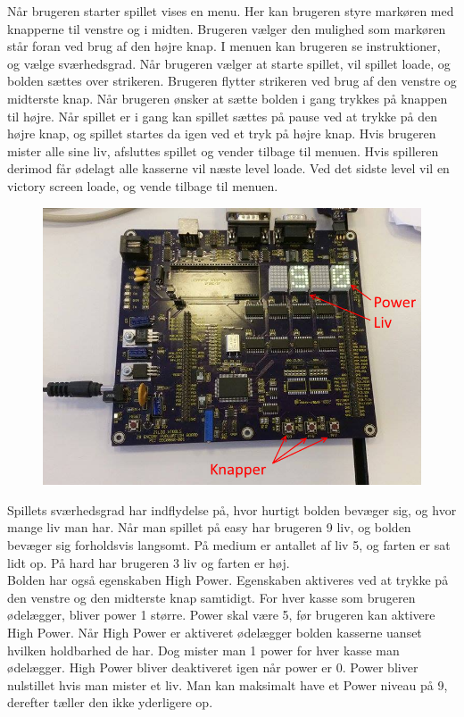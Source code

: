 Når brugeren starter spillet vises en menu. Her kan brugeren styre markøren med knapperne til venstre og i midten. Brugeren vælger den mulighed som markøren står foran ved brug af den højre knap. I menuen kan brugeren se instruktioner, og vælge sværhedsgrad. Når brugeren vælger at starte spillet, vil spillet loade, og bolden sættes over strikeren. Brugeren flytter strikeren ved brug af den venstre og midterste knap. Når brugeren ønsker at sætte bolden i gang trykkes på knappen til højre. Når spillet er i gang kan spillet sættes på pause ved at trykke på den højre knap, og spillet startes da igen ved et tryk på højre knap. Hvis brugeren mister alle sine liv, afsluttes spillet og vender tilbage til menuen. Hvis spilleren derimod får ødelagt alle kasserne vil næste level loade. Ved det sidste level vil en victory screen loade, og vende tilbage til menuen. \\
\begin{figure}[h]
\begin{center}
\includegraphics[scale=0.5]{img/Board.png}
\end{center}
\end{figure}
Spillets sværhedsgrad har indflydelse på, hvor hurtigt bolden bevæger sig, og hvor mange liv man har. Når man spillet på easy har brugeren 9 liv, og bolden bevæger sig forholdsvis langsomt. På medium er antallet af liv 5, og farten er sat lidt op. På hard har brugeren 3 liv og farten er høj.
\\
Bolden har også egenskaben High Power. Egenskaben aktiveres ved at trykke på den venstre og den midterste knap samtidigt.  For hver kasse som brugeren ødelægger, bliver power 1 større. Power skal være 5, før brugeren kan aktivere High Power. Når High Power er aktiveret ødelægger bolden kasserne uanset hvilken holdbarhed de har. Dog mister man 1 power for hver kasse man ødelægger. High Power bliver deaktiveret igen når power er 0. Power  bliver nulstillet hvis man mister et liv. Man kan maksimalt have et Power niveau på 9, derefter tæller den ikke yderligere op. \\

